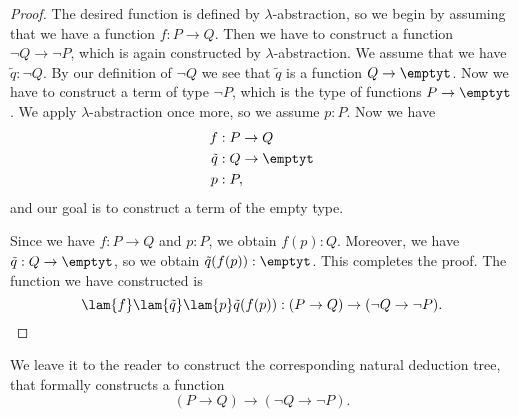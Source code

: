 \begin{proof}
  The desired function is defined by $\lambda$-abstraction, so we begin by assuming that we have a function $f:P\to Q$. Then we have to construct a function $\neg Q\to\neg P$, which is again constructed by $\lambda$-abstraction. We assume that we have $\tilde{q}:\neg Q$. By our definition of $\neg Q$ we see that $\tilde{q}$ is a function $Q\to\emptyt$. Now we have to construct a term of type $\neg P$, which is the type of functions $P\to\emptyt$. We apply $\lambda$-abstraction once more, so we assume $p:P$. Now we have
  \begin{align*}
    f & : P \to Q \\*
    \tilde{q} & : Q\to \emptyt \\*
    p & : P,
  \end{align*}
  and our goal is to construct a term of the empty type.

  Since we have $f:P\to Q$ and $p:P$, we obtain $f(p):Q$. Moreover, we have $\tilde{q}:Q\to\emptyt$, so we obtain $\tilde{q}(f(p)):\emptyt$. This completes the proof. The function we have constructed is
  \begin{equation*}
    \lam{f}\lam{\tilde{q}}\lam{p}\tilde{q}(f(p)):(P\to Q)\to(\neg Q\to\neg P).\qedhere
  \end{equation*}
\end{proof}

We leave it to the reader to construct the corresponding natural deduction tree, that formally constructs a function
\begin{equation*}
  (P\to Q)\to(\neg Q\to \neg P).
\end{equation*}

